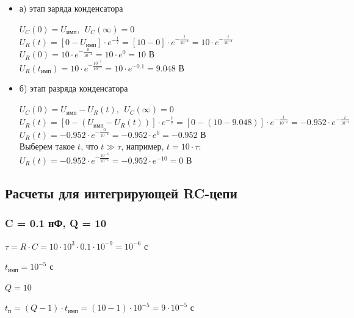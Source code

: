 \documentclass[a4paper,14pt]{extarticle}
\begin{document}
\begin{itemize}
\item[] а) этап заряда конденсатора

	$U_C(0)	= U_\text{имп},\ \ U_C(\infty) = 0$\\		
	$U_R(t) = [0 - U_\text{имп}] \cdot e^{-\frac{t}{\tau}} = [10 - 0] \cdot e^{-\frac{t}{10^{-4}}} = 10 \cdot e^{-\frac{t}{10^{-4}}}$\\
	$U_R(0) = 10 \cdot e^{-\frac{0}{10^{-4}}} = 10 \cdot e^0 = 10 \text{ В}$\\
	$U_R(t_\text{имп}) = 10 \cdot e^{-\frac{10^{-5}}{10^{-4}}} = 10 \cdot e^{-0.1} = 9.048 \text{ В}$

\item[] б) этап разряда конденсатора
	
	$U_C(0)	= U_\text{имп} - U_R(t),\ \ U_C(\infty) = 0$\\
	$U_R(t) = [0 - (U_\text{имп} - U_R(t))] \cdot e^{-\frac{t}{\tau}} = [0 - (10 - 9.048)] \cdot e^{-\frac{t}{10^{-4}}} = -0.952 \cdot e^{-\frac{t}{10^{-4}}}$\\
	$U_R(t) = -0.952 \cdot e^{-\frac{0}{10^{-4}}} = -0.952 \cdot e^0 = -0.952 \text{ В}$\\
	Выберем такое $t$, что $t \gg \tau$, например, $t = 10 \cdot \tau$:\\
	$U_R(t) = -0.952 \cdot e^{-\frac{10^{-3}}{10^{-4}}} = -0.952 \cdot e^{-10} = 0 \text{ В}$
\end{itemize}

\newpage

\subsection{Расчеты для интегрирующей RC-цепи}

\subsubsection{C = 0.1 нФ, Q = 10}

$\tau = R \cdot C = 10 \cdot 10^3 \cdot 0.1 \cdot 10^{-9} = 10^{-6} \text{ с}$
		
$t_\text{имп} = 10^{-5} \text{ с}$
		
$Q = 10$		
		
$t_\text{п} = (Q - 1) \cdot t_\text{имп} = (10 - 1) \cdot 10^{-5} = 9 \cdot 10^{-5} \text{ с}$
		
\end{document}
